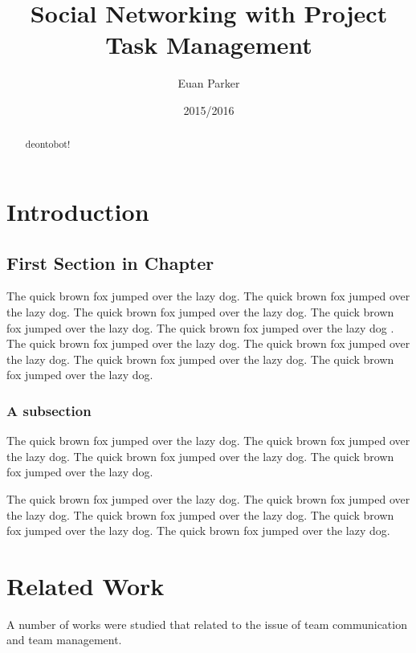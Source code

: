\documentclass{l4proj}
\begin{document}
\title{Social Networking with Project Task Management}
\author{Euan Parker}
\date{2015/2016}
\maketitle

\begin{abstract}
deontobot!
\end{abstract}

\educationalconsent
%
%
\tableofcontents

\chapter{Introduction}

\section{First Section in Chapter}
The quick brown fox jumped over the lazy dog.
The quick brown fox jumped over the lazy dog.
The quick brown fox jumped over the lazy dog.
The quick brown fox jumped over the lazy dog.
The quick brown fox jumped over the lazy dog \cite{Powers}.
The quick brown fox jumped over the lazy dog.
The quick brown fox jumped over the lazy dog.
The quick brown fox jumped over the lazy dog.
The quick brown fox jumped over the lazy dog.

\subsection{A subsection}
The quick brown fox jumped over the lazy dog.
The quick brown fox jumped over the lazy dog.
The quick brown fox jumped over the lazy dog.
The quick brown fox jumped over the lazy dog.

The quick brown fox jumped over the lazy dog.
The quick brown fox jumped over the lazy dog.
The quick brown fox jumped over the lazy dog.
The quick brown fox \cite{Wyner} jumped over the lazy dog.
The quick brown fox jumped over the lazy dog.

\chapter{Related Work}
A number of works were studied that related to the issue of team communication and team management.
\end{document}

